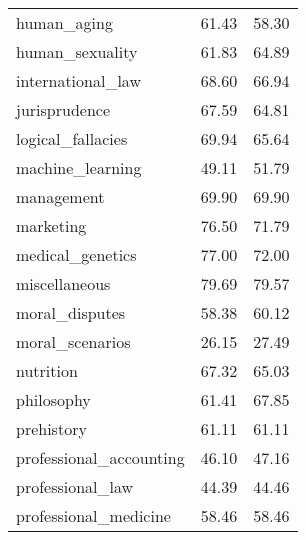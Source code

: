 \begin{table}[t]
\begin{tabular}{L{0.35}C{0.20}C{0.20}}
        human\_aging                            & 61.43                    & 58.30                      \\
        human\_sexuality                        & 61.83                    & 64.89                      \\
        international\_law                      & 68.60                    & 66.94                      \\
        jurisprudence                           & 67.59                    & 64.81                      \\
        logical\_fallacies                      & 69.94                    & 65.64                      \\
        machine\_learning                       & 49.11                    & 51.79                      \\
        management                              & 69.90                    & 69.90                      \\
        marketing                               & 76.50                    & 71.79                      \\
        medical\_genetics                       & 77.00                    & 72.00                      \\
        miscellaneous                           & 79.69                    & 79.57                      \\
        moral\_disputes                         & 58.38                    & 60.12                      \\
        moral\_scenarios                        & 26.15                    & 27.49                      \\
        nutrition                               & 67.32                    & 65.03                      \\
        philosophy                              & 61.41                    & 67.85                      \\
        prehistory                              & 61.11                    & 61.11                      \\
        professional\_accounting                & 46.10                    & 47.16                      \\
        professional\_law                       & 44.39                    & 44.46                      \\
        professional\_medicine                  & 58.46                    & 58.46                      \\

\end{tabular}
\end{table}

